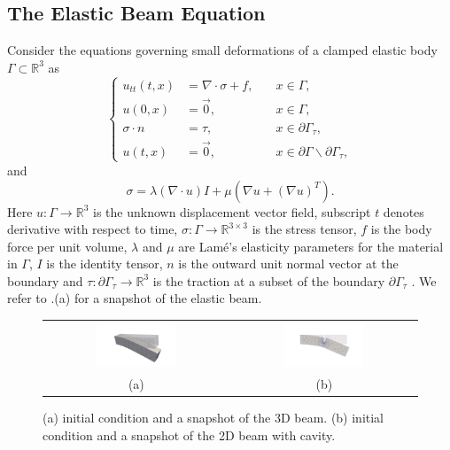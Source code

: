 \subsection{The Elastic Beam Equation} \label{sec:res.1}
Consider the equations governing small deformations of a clamped elastic body $\Gamma\subset \mathbb R^{3}$ as 
\begin{equation} \label{eq:res.1}
\left\{
\begin{aligned}
	u_{tt}(t,x) &= \nabla \cdot \sigma + f, \quad & x\in \Gamma, \\
	u(0,x) &= \vec 0, & x\in \Gamma,\\
	\sigma \cdot n &= \tau, & x \in \partial \Gamma_\tau,\\
	u(t,x) &= \vec 0, & x \in\partial \Gamma \backslash \partial \Gamma_\tau,
\end{aligned}
\right.
\end{equation}
and
\begin{equation}  \label{eq:res.2}
	\sigma = \lambda (\nabla \cdot u) I + \mu(\nabla u + (\nabla u)^T).
\end{equation}
Here $u:\Gamma \to \mathbb{R}^3$ is the unknown displacement vector field, subscript $t$ denotes derivative with respect to time, $\sigma:\Gamma \to \mathbb{R}^{3\times 3}$ is the stress tensor, $f$ is the body force per unit volume, $\lambda$ and $\mu$ are Lam\'e's elasticity parameters for the material in $\Gamma$, $I$ is the identity tensor, $n$ is the outward unit normal vector at the boundary and $\tau:\partial \Gamma_\tau \to \mathbb R^3$ is the traction at a subset of the boundary $\partial \Gamma_\tau$ \cite{langtangen2017solving}. We refer to .(a) for a snapshot of the elastic beam.

\begin{figure}[t] 
\begin{tabular}{cc}
\includegraphics[width=0.45\textwidth]{./images/paper2/beam3d.png} & \includegraphics[width=0.45\textwidth]{./images/paper2/beam2d.png} \\
(a) & (b)
\end{tabular}
\caption{(a) initial condition and a snapshot of the 3D beam. (b) initial condition and a snapshot of the 2D beam with cavity. } \label{fig:0}
\end{figure}


